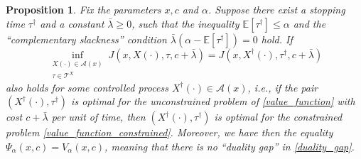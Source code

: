 \documentclass[11pt,tbtags,reqno]{article}
\newtheorem{Prop}[Th]{Proposition}
\theoremstyle{definition}
\numberwithin{equation}{section}
\theoremstyle{definition}
\newcommand{\ex}{\mathbb{E}}
\begin{document}
\begin{Prop}\label{prop_duality_gap}
    Fix the parameters $x, c$ and $\alpha$.
    Suppose there exist a stopping time $\tau^\dag$ and a constant $\bar{\lambda} \ge 0$, such that the inequality $\ex[\tau^\dag] \le \alpha$ and the ``complementary slackness'' condition $\bar{\lambda}(\alpha - \ex[\tau^\dag]) = 0$ hold. 
    If
    \begin{equation}\label{prop_techn_equality}
        \inf\limits_{\substack{X(\cdot) \in \mathcal{A}(x) \\ \tau \in \mathcal{T}^X}}
            J\left(x, X(\cdot), \tau, c + \bar{\lambda}\right)
        =
        J\left(x, X^\dag(\cdot), \tau^\dag, c + \bar{\lambda}\right)
    \end{equation}
    also holds for some controlled process $X^\dag(\cdot) \in \mathcal{A}(x)$, i.e., if the pair $\left(X^\dag(\cdot), \tau^\dag\right)$ is optimal for the unconstrained problem of \eqref{value_function} with cost $c + \bar{\lambda}$ per unit of time, then $\left(X^\dag(\cdot), \tau^\dag\right)$ is optimal for the constrained problem \eqref{value_function_constrained}. Moreover, we have then the equality $\Psi_\alpha(x, c) = V_\alpha(x, c)$, meaning that there is no ``duality gap'' in \eqref{duality_gap}.
\end{Prop}
\end{document}
